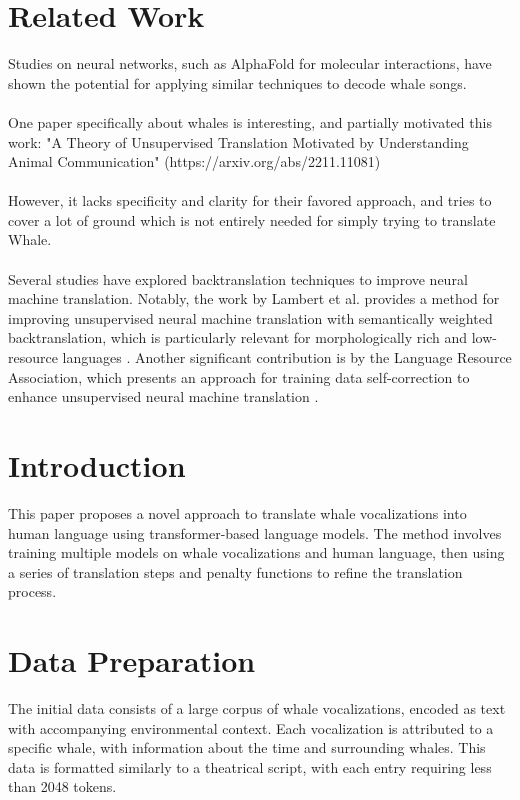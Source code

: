 \documentclass{article}
\begin{document}
\section{Related Work}
Studies on neural networks, such as AlphaFold for molecular interactions, have shown the potential for applying similar techniques to decode whale songs. \\ \\
One paper specifically about whales is interesting, and partially motivated this work:
"A Theory of Unsupervised Translation Motivated by Understanding Animal Communication" (https://arxiv.org/abs/2211.11081) \\ \\
However, it lacks specificity and clarity for their favored approach, and tries to cover a lot of ground which is not entirely needed for simply trying to translate Whale.\\ \\
Several studies have explored backtranslation techniques to improve neural machine translation. Notably, the work by Lambert et al. provides a method for improving unsupervised neural machine translation with semantically weighted backtranslation, which is particularly relevant for morphologically rich and low-resource languages \cite{backtranslation1}. Another significant contribution is by the Language Resource Association, which presents an approach for training data self-correction to enhance unsupervised neural machine translation \cite{backtranslation2}.


\section{Introduction}
This paper proposes a novel approach to translate whale vocalizations into human language using transformer-based language models. The method involves training multiple models on whale vocalizations and human language, then using a series of translation steps and penalty functions to refine the translation process.

\section{Data Preparation}
The initial data consists of a large corpus of whale vocalizations, encoded as text with accompanying environmental context. Each vocalization is attributed to a specific whale, with information about the time and surrounding whales. This data is formatted similarly to a theatrical script, with each entry requiring less than 2048 tokens.
\end{document}
